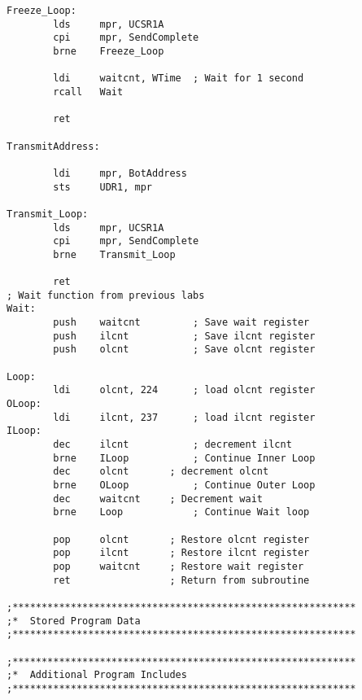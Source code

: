 \documentclass[12pt,letterpaper]{article}
\begin{document}
{\begin{verbatim}
Freeze_Loop:
		lds		mpr, UCSR1A
		cpi		mpr, SendComplete
		brne	Freeze_Loop

		ldi		waitcnt, WTime	; Wait for 1 second
		rcall	Wait

		ret

TransmitAddress:

		ldi		mpr, BotAddress
		sts		UDR1, mpr

Transmit_Loop:
		lds		mpr, UCSR1A
		cpi		mpr, SendComplete
		brne	Transmit_Loop

		ret
; Wait function from previous labs
Wait:
		push	waitcnt			; Save wait register
		push	ilcnt			; Save ilcnt register
		push	olcnt			; Save olcnt register

Loop:	
		ldi		olcnt, 224		; load olcnt register
OLoop:	
		ldi		ilcnt, 237		; load ilcnt register
ILoop:	
		dec		ilcnt			; decrement ilcnt
		brne	ILoop			; Continue Inner Loop
		dec		olcnt		; decrement olcnt
		brne	OLoop			; Continue Outer Loop
		dec		waitcnt		; Decrement wait 
		brne	Loop			; Continue Wait loop	

		pop		olcnt		; Restore olcnt register
		pop		ilcnt		; Restore ilcnt register
		pop		waitcnt		; Restore wait register
		ret					; Return from subroutine

;***********************************************************
;*	Stored Program Data
;***********************************************************

;***********************************************************
;*	Additional Program Includes
;***********************************************************
\end{verbatim}}
\end{document}
